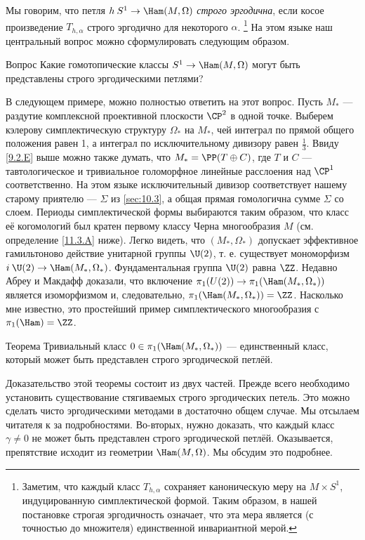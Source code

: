 Мы говорим, что петля $h\: S^1 \to \Ham(M, \Omega)$ \emph{строго эргодична}, если косое произведение $T_{h,\alpha}$ строго эргодично для некоторого $\alpha$.%
\footnote{Заметим, что каждый класс $T_{h,\alpha}$ сохраняет каноническую меру на $M \times S^1$, индуцированную симплектической формой.
Таким образом, в нашей постановке строгая эргодичность означает, что эта мера является (с точностью до множителя) единственной инвариантной мерой.}
На этом языке наш центральный вопрос можно сформулировать следующим образом.

\begin{ex*}{Вопрос}
Какие гомотопические классы $S^1 \to \Ham(M, \Omega)$ могут быть представлены строго эргодическими петлями?
\end{ex*}

В следующем примере, можно полностью ответить на этот вопрос.
Пусть $M_\ast$ --- раздутие комплексной проективной плоскости $\CP^2$ в одной точке.
Выберем кэлерову симплектическую структуру $\Omega_\ast$ на $M_\ast$, чей интеграл по прямой общего положения равен 1, а интеграл по исключительному дивизору равен $\tfrac13$.
Ввиду \ref{9.2.E} выше можно также думать, что $M_\ast = \PP(T \oplus C)$, где $T$ и $C$ --- тавтологическое и тривиальное голоморфное линейные расслоения над $\CP^1$ соответственно.
На этом языке исключительный дивизор соответствует нашему старому приятелю --- $\Sigma$ из \ref{sec:10.3}, а общая прямая гомологична сумме $\Sigma$ со слоем.
Периоды симплектической формы выбираются таким образом, что класс её когомологий был кратен первому классу Черна многообразия $M$ (см. определение \ref{11.3.A} ниже).
Легко видеть, что $(M_\ast, \Omega_\ast)$ допускает эффективное гамильтоново действие унитарной группы $\U(2)$, т. е. существует мономорфизм $i\: \U(2) \to \Ham(M_\ast, \Omega_\ast)$.
Фундаментальная группа $\U(2)$ равна $\ZZ$.
Недавно Абреу и Макдафф \cite{AM} доказали, что включение $\pi_1(U(2)) \to \pi_1 (\Ham(M_\ast, \Omega_\ast))$ является изоморфизмом и, следовательно, $\pi_1(\Ham(M_\ast, \Omega_\ast)) = \ZZ$.
Насколько мне известно, это простейший пример симплектического многообразия с $\pi_1 (\Ham) = \ZZ$.

\begin{thm}{Теорема}\label{11.1.A}
Тривиальный класс $0\in\pi_1(\Ham(M_\ast, \Omega_\ast))$ --- единственный класс, который может быть представлен строго эргодической петлёй.
\end{thm}

Доказательство этой теоремы состоит из двух частей.
Прежде всего необходимо установить существование стягиваемых строго эргодических петель.
Это можно сделать чисто эргодическими методами в достаточно общем случае.
Мы отсылаем читателя к \cite{P9} за подробностями.
Во-вторых, нужно доказать, что каждый класс $\gamma \ne 0$ не может быть представлен строго эргодической петлёй.
Оказывается, препятствие исходит из геометрии $\Ham(M, \Omega)$.
Мы обсудим это подробнее.


